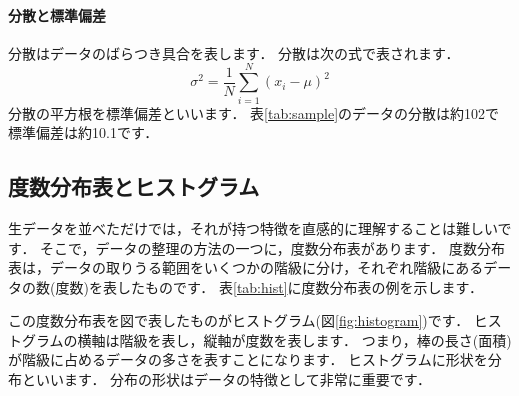 \paragraph{分散と標準偏差}
分散はデータのばらつき具合を表します．
分散は次の式で表されます．
\begin{equation}
    \sigma^2 = \frac{1}{N} \sum_{i=1}^{N} (x_i - \mu)^2
\end{equation}
分散の平方根を標準偏差といいます．
表\ref{tab:sample}のデータの分散は約102で標準偏差は約10.1です．

\subsection{度数分布表とヒストグラム}

生データを並べただけでは，それが持つ特徴を直感的に理解することは難しいです．
そこで，データの整理の方法の一つに，度数分布表があります．
度数分布表は，データの取りうる範囲をいくつかの階級に分け，それぞれ階級にあるデータの数(度数)を表したものです．
表\ref{tab:hist}に度数分布表の例を示します．


この度数分布表を図で表したものがヒストグラム(図\ref{fig:histogram})です．
ヒストグラムの横軸は階級を表し，縦軸が度数を表します．
つまり，棒の長さ(面積)が階級に占めるデータの多さを表すことになります．
ヒストグラムに形状を分布といいます．
分布の形状はデータの特徴として非常に重要です．



